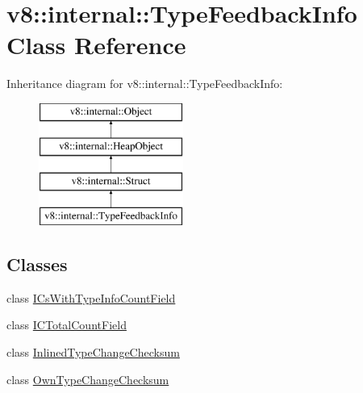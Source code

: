 \hypertarget{classv8_1_1internal_1_1_type_feedback_info}{}\section{v8\+:\+:internal\+:\+:Type\+Feedback\+Info Class Reference}
\label{classv8_1_1internal_1_1_type_feedback_info}
Inheritance diagram for v8\+:\+:internal\+:\+:Type\+Feedback\+Info\+:\begin{figure}[H]
\begin{center}
\leavevmode
\includegraphics[height=4.000000cm]{classv8_1_1internal_1_1_type_feedback_info}
\end{center}
\end{figure}
\subsection*{Classes}
\begin{DoxyCompactItemize}
\item 
class \hyperlink{classv8_1_1internal_1_1_type_feedback_info_1_1_i_cs_with_type_info_count_field}{I\+Cs\+With\+Type\+Info\+Count\+Field}
\item 
class \hyperlink{classv8_1_1internal_1_1_type_feedback_info_1_1_i_c_total_count_field}{I\+C\+Total\+Count\+Field}
\item 
class \hyperlink{classv8_1_1internal_1_1_type_feedback_info_1_1_inlined_type_change_checksum}{Inlined\+Type\+Change\+Checksum}
\item 
class \hyperlink{classv8_1_1internal_1_1_type_feedback_info_1_1_own_type_change_checksum}{Own\+Type\+Change\+Checksum}
\end{DoxyCompactItemize}
